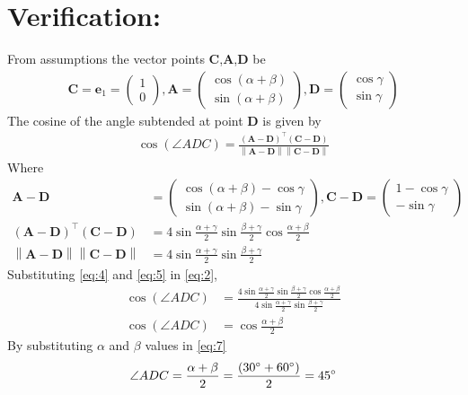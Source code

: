 \documentclass[12pt]{article}
\providecommand{\norm}[1]{\left\lVert#1\right\rVert}
\newcommand{\myvec}[1]{\ensuremath{\begin{pmatrix}#1\end{pmatrix}}}
\let\vec\mathbf
\begin{document}
\section*{Verification:}
 From assumptions the vector points $\vec{C}$,$\vec{A}$,$\vec{D}$ be
\begin{align}
	\vec{C} =\vec{e}_1= \myvec{1\\0},
	\vec{A} = \myvec{\cos(\alpha+\beta)\\\sin(\alpha+\beta)},
	\vec{D} = \myvec{\cos\gamma\\\sin\gamma}
\end{align}
 The cosine of the angle subtended at point $\vec{D}$ is given by
\begin{align}
	\cos(\angle ADC) = \frac{\vec{(A-D)^\top(C-D)}}{\norm{\vec{A-D}}\norm{\vec{C-D}}}
	\label{eq:2}
\end{align}
Where
 \begin{align}
	 \vec{A-D}& = \myvec{\cos(\alpha+\beta) - \cos\gamma\\\sin(\alpha+\beta) - \sin\gamma},
	 \vec{C-D} = \myvec{1 - \cos\gamma\\-\sin\gamma}\\
	 \label{eq:4} \vec{(A-D)^\top(C-D)}&= 4\sin\frac{\alpha+\gamma}2\sin\frac{\beta+\gamma}2\cos\frac{\alpha+\beta}2\\
	 \norm{\vec{A-D}}\norm{\vec{C-D}}& = 4 \sin\frac{\alpha+\gamma}2\sin\frac{\beta+\gamma}2
	\label{eq:5}
\end{align}
Substituting \eqref{eq:4} and \eqref{eq:5} in \eqref{eq:2},
\begin{align}
	\cos(\angle ADC) &= \frac{4\sin\frac{\alpha+\gamma}{2}\sin\frac{\beta+\gamma}{2}\cos\frac{\alpha+\beta}{2}}{4 \sin\frac{\alpha+\gamma}2\sin\frac{\beta+\gamma}2}\\
	\cos(\angle ADC) &= \cos\frac{\alpha+\beta}{2}
	\label{eq:7}
\end{align}
By substituting $\alpha$ and $\beta$ values in \eqref{eq:7}
\begin{align}
\angle ADC = \frac{\alpha+\beta}{2}=\frac{(30\degree + 60\degree )}{2}=45\degree
\end{align}
\end{document}
